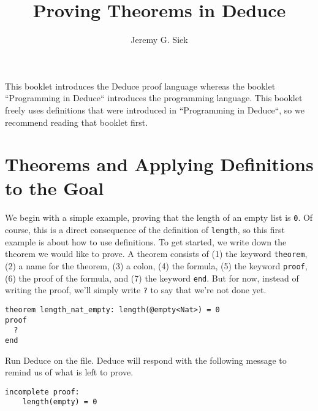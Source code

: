 \documentclass[12pt]{article}
\title{Proving Theorems in Deduce}
\author{Jeremy G. Siek}
\newif\ifBorder
\begin{document}

\Bordertrue

\maketitle

{\footnotesize
\tableofcontents
}
\pagebreak



This booklet introduces the Deduce proof language whereas the booklet
``Programming in Deduce`` introduces the programming language.  This
booklet freely uses definitions that were introduced in ``Programming
in Deduce``, so we recommend reading that booklet first.

\section{Theorems and Applying Definitions to the Goal}

We begin with a simple example, proving that the length of an empty
list is \texttt{0}. Of course, this is a direct consequence of the
definition of \texttt{length}, so this first example is about how to
use definitions.  To get started, we write down the theorem we would
like to prove.  A theorem consists of (1) the keyword
\texttt{theorem}, (2) a name for the theorem, (3) a colon, (4) the
formula, (5) the keyword \texttt{proof}, (6) the proof of the formula,
and (7) the keyword \texttt{end}. But for now, instead of writing the
proof, we'll simply write \texttt{?} to say that we're not done yet.

\begin{verbatim}
theorem length_nat_empty: length(@empty<Nat>) = 0
proof
  ?
end
\end{verbatim}

\noindent Run Deduce on the file. Deduce will respond with the following message
to remind us of what is left to prove.

\begin{verbatim}
incomplete proof:
    length(empty) = 0
\end{verbatim}
\end{document}

